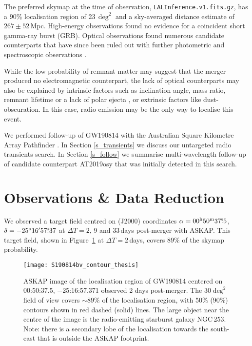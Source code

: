 The preferred skymap at the time of observation, \texttt{LALInference.v1.fits.gz}, has a 90\% localisation region of 23\,$\deg^2$ and a sky-averaged distance estimate of $267\pm52$\,Mpc. High-energy observations \citep{GCN25323,GCN25326,GCN25327,GCN25329,GCN25341} found no evidence for a coincident short gamma-ray burst (GRB). Optical observations found numerous candidate counterparts that have since been ruled out with further photometric and spectroscopic observations \citep{2020ApJ...890..131A}. 

While the low probability of remnant matter \citep{GCN25333} may suggest that the merger produced no electromagnetic counterpart, the lack of optical counterparts may also be explained by intrinsic factors such as inclination angle, mass ratio, remnant lifetime or a lack of polar ejecta \citep{2017Natur.551...80K}, or extrinsic factors like dust-obscuration. In this case, radio emission may be the only way to localise this event.

We performed follow-up of GW190814 with the Australian Square Kilometre Array Pathfinder \citep[ASKAP;][]{2008ExA....22..151J}. In Section \ref{s_transients} we discuss our untargeted radio transients search. In Section \ref{s_follow} we summarise multi-wavelength follow-up of candidate counterpart AT2019osy that was initially detected in this search.   

\vspace{-6pt}
\section{Observations \& Data Reduction}
\vspace{-6pt}
We observed a target field centred on (J2000) coordinates $\alpha=00^{\rm h}50^{\rm m}37\mbox{$.\!\!^{\mathrm s}$}5$$^{}$, $\delta=-25\mbox{$^\circ$}16\mbox{$^\prime$}57\mbox{$.\!\!^{\mathrm s}$}37$ at $\Delta T=2$, 9 and 33\,days post-merger with ASKAP. This target field, shown in Figure~\ref{fig:askap_img} at $\Delta T=2$\,days, covers $89\%$ of the skymap probability. 


\begin{figure}
    \centering
    \texttt{[image: S190814bv\_contour\_thesis]}
    \caption[ASKAP image of the localisation region of GW190814]{ASKAP image of the localisation region of GW190814 centered on 00:50:37.5, $-$25:16:57.371 observed 2 days post-merger. The 30$\deg^2$ field of view covers $\sim 89\%$ of the localisation region, with 50\% (90\%) contours shown in red dashed (solid) lines. The large object near the centre of the image is the radio-emitting starburst galaxy NGC\,253. Note: there is a secondary lobe of the localisation towards the south-east that is outside the ASKAP footprint.}
    \label{fig:askap_img}
\end{figure}

